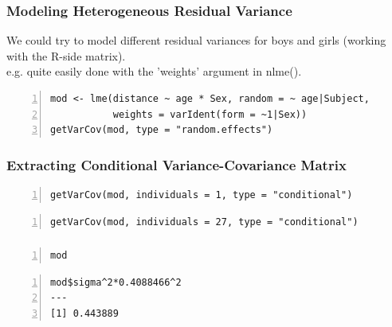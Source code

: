 \documentclass{beamer}
\begin{document}
\begin{frame}[fragile]
    \frametitle{Modeling Heterogeneous Residual Variance}
    We could try to model different residual variances for boys and girls (working with the R-side matrix).\\
    e.g. quite easily done with the 'weights' argument in nlme().
    \vspace{0.5cm}

    \scriptsize
    \begin{Verbatim}[numbers=left,numbersep=6pt,frame=single]
mod <- lme(distance ~ age * Sex, random = ~ age|Subject, 
           weights = varIdent(form = ~1|Sex))
getVarCov(mod, type = "random.effects")
    \end{Verbatim}
    \vspace{0.5cm}
    
    \scalebox{1}{
        
    }
\end{frame}

\begin{frame}[fragile]
    \frametitle{Extracting Conditional Variance-Covariance Matrix}
    \scriptsize
    \begin{Verbatim}[numbers=left,numbersep=6pt,frame=single]
getVarCov(mod, individuals = 1, type = "conditional")        
    \end{Verbatim}
    \scalebox{1}{
        
    }

    \begin{Verbatim}[numbers=left,numbersep=6pt,frame=single]
getVarCov(mod, individuals = 27, type = "conditional")      
    \end{Verbatim}
    \scalebox{1}{
        
    }
\end{frame}

\begin{frame}[fragile]
    \frametitle{}
    \scriptsize
    \begin{Verbatim}[numbers=left,numbersep=6pt,frame=single]
mod
    \end{Verbatim}
    \tiny\scalebox{1}{
        
    }
    \scriptsize
    \begin{Verbatim}[numbers=left,numbersep=6pt,frame=single]
mod$sigma^2*0.4088466^2
---
[1] 0.443889
    \end{Verbatim}
\end{frame}
\end{document}
